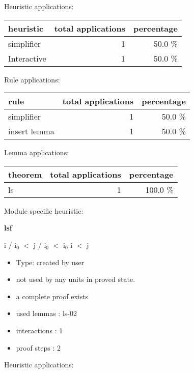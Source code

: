 \documentclass[a4paper]{article}
\begin{document}
\medskip


Heuristic applications:

\begin{supertabular}{l|r|r}
heuristic	& total applications & percentage \\ \hline
simplifier & 1 & 50.0 \% \\
Interactive & 1 & 50.0 \% \\

\end{supertabular}

Rule applications:

\begin{supertabular}{l|r|r}
rule	        & total applications & percentage \\ \hline
simplifier & 1 & 50.0 \% \\
insert lemma & 1 & 50.0 \% \\

\end{supertabular}

Lemma applications:

\begin{supertabular}{l|r|r}
theorem	        & total applications & percentage \\ \hline
ls & 1 & 100.0 \% \\

\end{supertabular}

Module specific heuristic:

\pagebreak

{\LARGE\bf lsf}\label{lemma-lsf}

\medskip

 \Fol i / $\mbox{i}_{0}$ $<$ j / $\mbox{i}_{0}$  $<$ $\mbox{i}_{0}$ \Imp i $<$ j

\begin{itemize}

\item Type: created by user

\item not used by any units in proved state.
\item       a complete proof exists
\item       used lemmas  : ls-02
\item       interactions : 1
\item       proof steps  : 2
\end{itemize}

\medskip


Heuristic applications:
\end{document}
